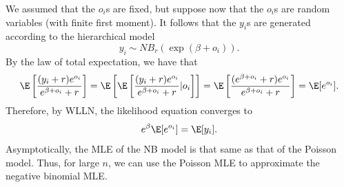 \documentclass[12pt]{article}
\begin{document}
We assumed that the $o_i$s are fixed, but suppose now that the $o_i$s are random variables (with finite first moment). It follows that the $y_i$s are generated according to the hierarchical model 
$$y_i \sim NB_r(\exp( \beta + o_i)) .$$ By the law of total expectation, we have that
\begin{multline*} \E \left[ \frac{(y_i + r) e^{o_i}}{ e^{\beta + o_i} + r } \right] = \E \left[ \E\left[ \frac{ (y_i + r) e^{o_i} }{ e^{\beta + o_i} + r } | o_i\right] \right] = \E \left[ \frac{ (e^{\beta + o_i} + r) e^{o_i}}{ e^{\beta + o_i} + r } \right] = \E [ e^{o_i} ].
\end{multline*}
 Therefore, by WLLN, the likelihood equation converges to
 $$ e^{\beta} \E[ e^{o_i} ] = \E[y_i].$$ Asymptotically, the MLE of the NB model is that same as that of the Poisson model. Thus, for large $n$, we can use the Poisson MLE to approximate the negative binomial MLE.
 
 
 




\end{document}
